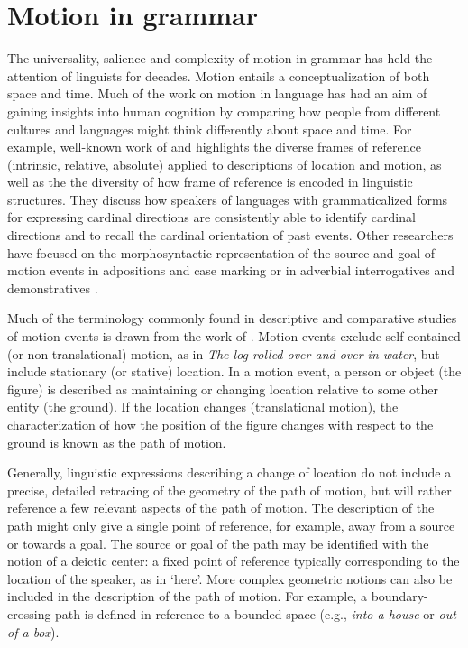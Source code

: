 \section{Motion in grammar} \label{sec:motion}

The universality, salience and complexity of motion in grammar has held the attention of linguists for decades. Motion entails a conceptualization of both space and time. Much of the work on motion in language has had an aim of gaining insights into human cognition by comparing how people from different cultures and languages might think differently about space and time. For example, well-known work of \citet{levinsonSpaceLanguageCognition2003} and \citet{levinsonGrammarsSpaceExplorations2006} highlights the diverse frames of reference (intrinsic, relative, absolute) applied to descriptions of location and motion, as well as the the diversity of how frame of reference is encoded in linguistic structures. They discuss how speakers of languages with grammaticalized forms for expressing cardinal directions are consistently able to identify cardinal directions and to recall the cardinal orientation of past events. Other researchers have focused on the morphosyntactic representation of the source and goal of motion events in adpositions and case marking or in adverbial interrogatives and demonstratives \citep{creisselsEncodingDistinctionLocation2006, kopeckaSourcegoalAsymmetriesLanguages2021, nintemannHereHitherHence2020, stolzCrosslinguisticsZeromarkingSpatial2014, stolzSpatialInterrogativesEurope2017}.

Much of the terminology commonly found in descriptive and comparative studies of motion events is drawn from the work of \citet{talmyLexicalizationPatternsSemantic1985}  \citep[see also][25--26]{talmyCognitiveSemantics2000}. Motion events exclude self-contained (or non-translational) motion, as in \textit{The log rolled over and over in water}, but include stationary (or stative) location. In a motion event, a person or object (the figure) is described as maintaining or changing location relative to some other entity (the ground). If the location changes (translational motion), the characterization of how the position of the figure changes with respect to the ground is known as the path of motion. 

Generally, linguistic expressions describing a change of location do not include a precise, detailed retracing of the geometry of the path of motion, but will rather reference a few relevant aspects of the path of motion. The description of the path might only give a single point of reference, for example, away from a source or towards a goal. The source or goal of the path may be identified with the notion of a deictic center: a fixed point of reference typically corresponding to the location of the speaker, as in `here'. More complex geometric notions can also be included in the description of the path of motion. For example, a boundary-crossing path is defined in reference to a bounded space (e.g., \textit{into a house} or \textit{out of a box}).%

